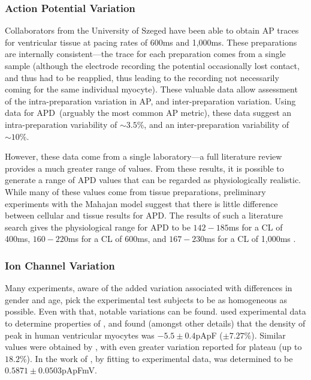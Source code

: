 \documentclass[../thesis-main.tex]{subfiles}
\begin{document}
 \subsubsection{Action Potential Variation}
 \label{subsubsec:ap-variation}
 Collaborators from the University of Szeged have been able to obtain AP traces for ventricular tissue at pacing rates of 600ms and 1,000ms. These preparations are internally consistent---the trace for each preparation comes from a single sample (although the electrode recording the potential occasionally lost contact, and thus had to be reapplied, thus leading to the recording not necessarily coming for the same individual myocyte). These valuable data allow assessment of the intra-preparation variation in AP, and inter-preparation variation. Using data for APD~(arguably the most common AP metric), these data suggest an intra-preparation variability of $\sim3.5\%$, and an inter-preparation variability of $\sim10\%$.
 
 However, these data come from a single laboratory---a full literature review provides a much greater range of values. From these results, it is possible to generate a range of APD values that can be regarded as physiologically realistic. While many of these values come from tissue preparations, preliminary experiments with the Mahajan model suggest that there is little difference between cellular and tissue results for APD. The results of such a literature search gives the physiological range for APD to be $142-185$ms for a CL of 400ms, $160-220$ms for a CL of 600ms, and $167-230$ms for a CL of 1,000ms \citep{Biagetti2006, Szigligeti1996, Yan2001, Jung2011, Goldhaber2005, Wu2011, Chen2006, Kirchhof2003, Eckardt1998, Zabel1997, Zabel1997a, Kurz1993, McIntosh2000}.
 
 \subsubsection{Ion Channel Variation}
 \label{subsubsec:ionChannel-variation}
 Many experiments, aware of the added variation associated with differences in gender and age, pick the experimental test subjects to be as homogeneous as possible. Even with that, notable variations can be found. \citet{Fulop2004} used experimental data to determine properties of \ica{}, and found (amongst other details) that the density of peak \ica{} in human ventricular myocytes was $-5.5\pm0.4$pApF ($\pm7.27\%$). Similar values were obtained by \citet{Li1999}, with even greater variation reported for plateau \ica{} (up to $18.2\%$). In the work of \citet{Fink2008}, by fitting to experimental data, \gkix{} was determined to be $0.5871\pm0.0503$pApFmV.
 
\end{document}
